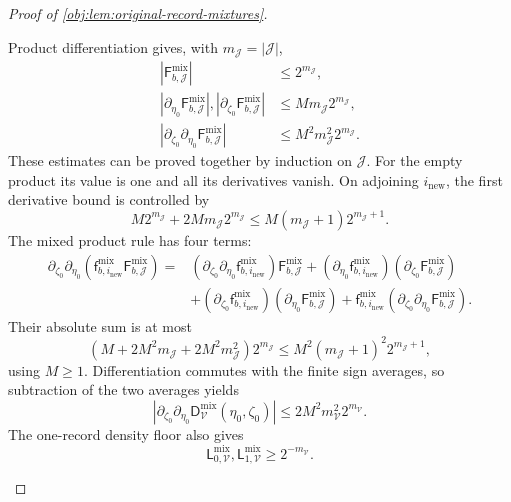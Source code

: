\documentclass[11pt]{article}
\begin{document}
\begin{proof}[Proof of \cref{obj:lem:original-record-mixtures}]
\begin{enumerate}
Product differentiation gives, with \(m_{\mathcal J}=|\mathcal J|\),
\[
\begin{aligned}
|\mathsf F_{b,\mathcal J}^{\mathrm{mix}}|&\le2^{m_{\mathcal J}},\\
|\partial_{\eta_0}\mathsf F_{b,\mathcal J}^{\mathrm{mix}}|,
|\partial_{\zeta_0}\mathsf F_{b,\mathcal J}^{\mathrm{mix}}|
&\le M m_{\mathcal J}2^{m_{\mathcal J}},\\
|\partial_{\zeta_0}\partial_{\eta_0}
\mathsf F_{b,\mathcal J}^{\mathrm{mix}}|
&\le M^2m_{\mathcal J}^2 2^{m_{\mathcal J}}.
\end{aligned}
\]
These estimates can be proved together by induction on
\(\mathcal J\). For the empty product its value is one and all its
derivatives vanish. On adjoining \(i_{\mathrm{new}}\), the first
derivative bound is controlled by
\[
M2^{m_{\mathcal J}}+
2M m_{\mathcal J}2^{m_{\mathcal J}}
\le
M(m_{\mathcal J}+1)2^{m_{\mathcal J}+1}.
\]
The mixed product rule has four terms:
\[
\begin{aligned}
\partial_{\zeta_0}\partial_{\eta_0}
\left(\mathsf f_{b,i_{\mathrm{new}}}^{\mathrm{mix}}
\mathsf F_{b,\mathcal J}^{\mathrm{mix}}\right)
={}&
(\partial_{\zeta_0}\partial_{\eta_0}
\mathsf f_{b,i_{\mathrm{new}}}^{\mathrm{mix}})
\mathsf F_{b,\mathcal J}^{\mathrm{mix}}
+
(\partial_{\eta_0}\mathsf f_{b,i_{\mathrm{new}}}^{\mathrm{mix}})
(\partial_{\zeta_0}\mathsf F_{b,\mathcal J}^{\mathrm{mix}})\\
&+
(\partial_{\zeta_0}\mathsf f_{b,i_{\mathrm{new}}}^{\mathrm{mix}})
(\partial_{\eta_0}\mathsf F_{b,\mathcal J}^{\mathrm{mix}})
+
\mathsf f_{b,i_{\mathrm{new}}}^{\mathrm{mix}}
(\partial_{\zeta_0}\partial_{\eta_0}
\mathsf F_{b,\mathcal J}^{\mathrm{mix}}).
\end{aligned}
\]
Their absolute sum is at most
\[
\left(M+2M^2m_{\mathcal J}
+2M^2m_{\mathcal J}^2\right)2^{m_{\mathcal J}}
\le
M^2(m_{\mathcal J}+1)^2 2^{m_{\mathcal J}+1},
\]
using \(M\ge1\). Differentiation commutes with the finite sign
averages, so subtraction of the two averages yields
\[
|\partial_{\zeta_0}\partial_{\eta_0}
\mathsf D_{\mathcal V}^{\mathrm{mix}}(\eta_0,\zeta_0)|
\le
2M^2m_{\mathcal V}^2 2^{m_{\mathcal V}}.
\]
The one-record density floor also gives
\[
\mathsf L_{0,\mathcal V}^{\mathrm{mix}},
\mathsf L_{1,\mathcal V}^{\mathrm{mix}}
\ge2^{-m_{\mathcal V}}.
\]


\end{enumerate}
\end{proof}
\end{document}

